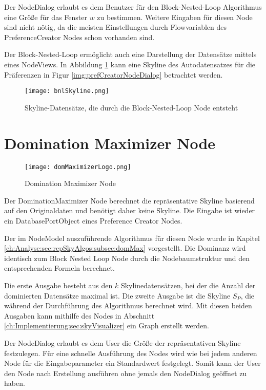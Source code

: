 Der NodeDialog erlaubt es dem Benutzer für den Block-Nested-Loop Algorithmus eine Größe für das Fenster $w$ zu bestimmen. Weitere Eingaben für diesen Node sind nicht nötig, da die meisten Einstellungen durch Flowvariablen des PreferenceCreator Nodes schon vorhanden sind.

Der Block-Nested-Loop ermöglicht auch eine Darstellung der Datensätze mittels eines NodeViews. In Abbildung \ref{img:bnlSkyline} kann eine Skyline des Autodatensatzes für die Präferenzen in Figur \ref{img:prefCreatorNodeDialog} betrachtet werden.

\begin{figure}[H]
	\centering
	\texttt{[image: bnlSkyline.png]}
	\caption{Skyline-Datensätze, die durch die Block-Nested-Loop Node entsteht}
	\label{img:bnlSkyline}
\end{figure}
\section{Domination Maximizer Node}
\label{ch:Implementierung:sec:dominationMaximizerNode}
\begin{figure}[H]
	\centering
	\texttt{[image: domMaximizerLogo.png]}
	\caption{Domination Maximizer Node}
	\label{img:domMaximierLogo}
\end{figure}

Der DominationMaximizer Node berechnet die repräsentative Skyline basierend auf den Originaldaten und benötigt daher keine Skyline. Die Eingabe ist wieder ein DatabasePortObject eines Preference Creator Nodes.

Der im NodeModel auszuführende Algorithmus für diesen Node wurde in Kapitel \ref{ch:Analyse:sec:repSkyAlgos:subsec:domMax} vorgestellt. Die Dominanz wird identisch zum Block Nested Loop Node durch die Nodebaumstruktur und den entsprechenden Formeln berechnet.

Die erste Ausgabe besteht aus den $k$ Skylinedatensätzen, bei der die Anzahl der dominierten Datensätze maximal ist. Die zweite Ausgabe ist die Skyline $S_P$, die während der Durchführung des Algorithmus berechnet wird. Mit diesen beiden Ausgaben kann mithilfe des Nodes in Abschnitt \ref{ch:Implementierung:sec:skyVisualizer} ein Graph erstellt werden. 

Der NodeDialog erlaubt es dem User die Größe der repräsentativen Skyline festzulegen. Für eine schnelle Ausführung des Nodes wird wie bei jedem anderen Node für die Eingabeparameter ein Standardwert festgelegt. Somit kann der User den Node nach Erstellung ausführen ohne jemals den NodeDialog geöffnet zu haben.   
